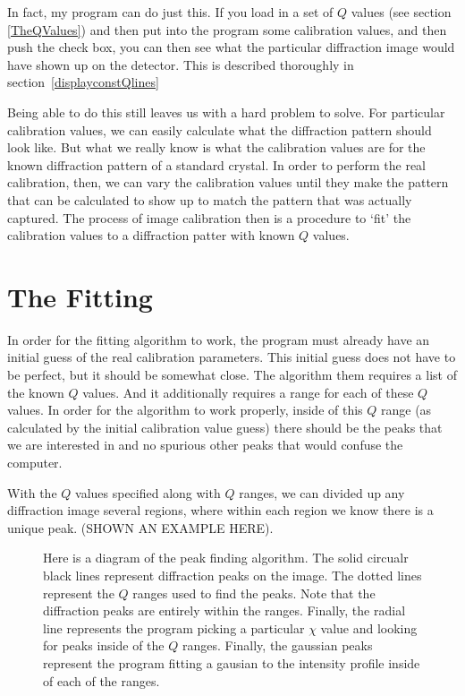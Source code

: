 In fact, my program can do just this. If you load in 
a set of $Q$ values (see section 
\ref{TheQValues})
and then put into the program some calibration values,
and then push the  check box, 
you can then see what the particular diffraction
image would have shown up on the detector. 
This is described thoroughly in 
section~\ref{displayconstQlines}

Being able to do this still leaves us with a hard 
problem to solve. For particular calibration values,
we can easily calculate what the diffraction pattern 
should look like. But what we really know is what
the calibration values are for the known diffraction
pattern of a standard crystal. In order to perform the
real calibration, then, we can vary the calibration 
values until they make the pattern that can be calculated
to show up to match the pattern that was actually 
captured. The process of image calibration then is a 
procedure to `fit' the calibration values to a
diffraction patter with known $Q$ values.

\section{The Fitting} 
\label{fitting_sec}

In order for the fitting algorithm to work, the program 
must already have an initial guess of the real calibration 
parameters. This initial guess does not have to be perfect, 
but it should be somewhat close. The algorithm them requires 
a list of the known $Q$ values. And it additionally requires 
a range for each of these $Q$ values. In order for the 
algorithm to work properly, inside of this $Q$ range (as 
calculated by the initial calibration value guess) there 
should be the peaks that we are interested in and no spurious 
other peaks that would confuse the computer.

With the $Q$ values specified along with $Q$ ranges, we can
divided up any diffraction image several regions, where
within each region we know there is a unique peak.
(SHOWN AN EXAMPLE HERE).

\begin{figure}
\centering

\caption{Here is a diagram of the peak finding algorithm. 
The solid circualr black lines represent diffraction
peaks on the image. The dotted lines represent the
$Q$ ranges used to find the peaks. Note that the diffraction
peaks are entirely within the ranges. Finally, the radial
line represents the program picking a particular $\chi$
value and looking for peaks inside of the $Q$ ranges.
Finally, the gaussian peaks represent the program fitting
a gausian to the intensity profile inside of each of the
ranges.}
\label{fitting}
\end{figure}

